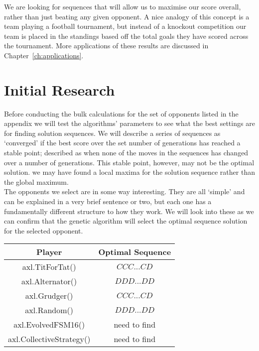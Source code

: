 We are looking for sequences that will allow us to maximise our score overall, rather than just beating any given opponent.
A nice analogy of this concept is a team playing a football tournament, but instead of a knockout competition our team is placed in the standings based off the total goals they have scored across the tournament. 
More applications of these results are discussed in Chapter~\ref{ch:applications}.

\section{Initial Research}\label{sec:initialResearch}
Before conducting the bulk calculations for the set of opponents listed in the appendix we will test the algorithms' parameters to see what the best settings are for finding solution sequences.
We will describe a series of sequences as `converged' if the best score over the set number of generations has reached a stable point; described as when none of the moves in the sequences has changed over a number of generations.
This stable point, however, may not be the optimal solution.
we may have found a local maxima for the solution sequence rather than the global maximum. \\

The opponents we select are in some way interesting.
They are all `simple' and can be explained in a very brief sentence or two, but each one has a fundamentally different structure to how they work.
We will look into these as we can confirm that the genetic algorithm will select the optimal sequence solution for the selected opponent. \\

\begin{center}
    \begin{tabular}{|c|c|} 
    \hline
    Player & Optimal Sequence \\
    \hline
    axl.TitForTat()&\(CCC...CD\)\\
    axl.Alternator()&\(DDD...DD\)\\
    axl.Grudger()&\(CCC...CD\)\\
    axl.Random()&\(DDD...DD\)\\
    axl.EvolvedFSM16()&need to find\\
    axl.CollectiveStrategy()&need to find\\
    \hline
    \end{tabular}
\end{center}

